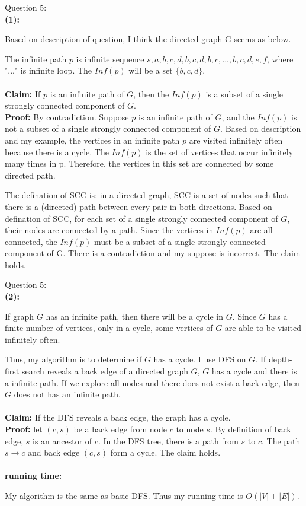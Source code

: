 \documentclass[12pt]{article}
\begin{document}
\pagebreak
\noindent
\large Question 5: \\
\normalsize 
\setlength{\baselineskip}{8mm}
\noindent
\textbf{(1):} \par
Based on description of question, I think the directed graph G seems as below. \\
 \par
The infinite path $p$ is infinite sequence $s, a, b, c, d, b, c ,d, b, c, ..., b, c, d, e, f$, where "..." is infinite loop. 
The $Inf(p)$ will be a set $\{b, c, d\}$. \\
\\
\textbf{Claim: } If $p$ is an infinite path of $G$, then the $Inf(p)$ is a subset of a single strongly connected component of $G$. \\
\textbf{Proof: } By contradiction. Suppose $p$ is an infinite path of $G$, and the $Inf(p)$ is not a subset of a single strongly connected component of $G$. 
Based on description and my example, the vertices in an infinite path $p$ are visited infinitely often because there is a cycle. 
The $Inf(p)$ is the set of vertices that occur infinitely many times in p. Therefore, the vertices in this set are connected by some directed path. \par
The defination of SCC is: in a directed graph, SCC is a set of nodes such that there is a (directed) path between every pair in both directions.
Based on defination of SCC, for each set of a single strongly connected component of $G$, their nodes are connected by a path. 
Since the vertices in $Inf(p)$ are all connected, the $Inf(p)$ must be a subset of a single strongly connected component of G. 
There is a contradiction and my suppose is incorrect. The claim holds.



\pagebreak
\noindent
\large Question 5: \\
\normalsize 
\setlength{\baselineskip}{8mm}
\noindent
\textbf{(2):} \par
If graph $G$ has an infinite path, then there will be a cycle in $G$.
Since $G$ has a finite number of vertices, only in a cycle, some vertices of $G$ are able to be visited infinitely often. \par
Thus, my algorithm is to determine if $G$ has a cycle.
I use DFS on $G$. If depth-first search reveals a back edge of a directed graph $G$, $G$ has a cycle and there is a infinite path. 
If we explore all nodes and there does not exist a back edge, then $G$ does not has an infinite path.   \\
\\
\textbf{Claim: } If the DFS reveals a back edge, the graph has a cycle.\\
\textbf{Proof: } let $(c, s)$ be a back edge from node $c$ to node $s$. By definition of back edge, $s$ is an ancestor of $c$.
In the DFS tree, there is a path from $s$ to $c$. The path $s \rightarrow c$ and back edge $(c, s)$ form a cycle. The claim holds. \\
\\
\textbf{running time:} \par
My algorithm is the same as basic DFS. Thus my running time is $O(|V| + |E|)$.
\end{document}
